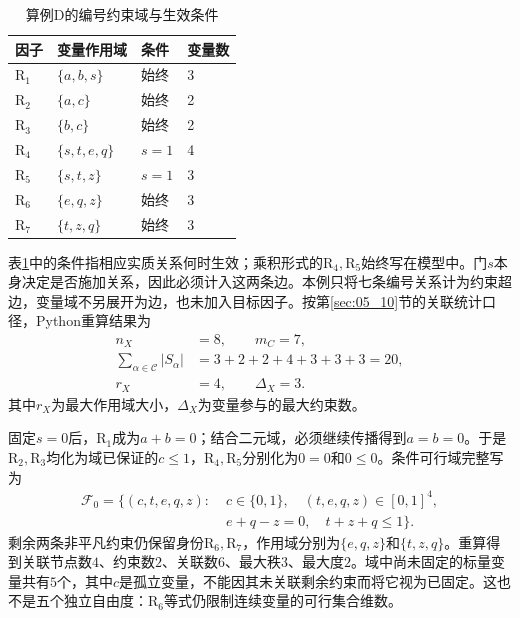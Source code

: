 \begin{table}[htbp]
\centering
\caption{算例D的编号约束域与生效条件}
\label{s0511:scopes}
\begin{tabular}{llll}
\toprule
因子 & 变量作用域 & 条件 & 变量数\\
\midrule
$\mathrm R_1$ & $\{a,b,s\}$ & 始终 & 3\\
$\mathrm R_2$ & $\{a,c\}$ & 始终 & 2\\
$\mathrm R_3$ & $\{b,c\}$ & 始终 & 2\\
$\mathrm R_4$ & $\{s,t,e,q\}$ & $s=1$ & 4\\
$\mathrm R_5$ & $\{s,t,z\}$ & $s=1$ & 3\\
$\mathrm R_6$ & $\{e,q,z\}$ & 始终 & 3\\
$\mathrm R_7$ & $\{t,z,q\}$ & 始终 & 3\\
\bottomrule
\end{tabular}
\end{table}

表\ref{s0511:scopes}中的条件指相应实质关系何时生效；乘积形式的$\mathrm R_4,\mathrm R_5$始终写在模型中。门$s$本身决定是否施加关系，因此必须计入这两条边。本例只将七条编号关系计为约束超边，变量域不另展开为边，也未加入目标因子。按第\ref{sec:05_10}节的关联统计口径，Python重算结果为
\begin{equation}
\label{s0511:original_counts}
\begin{aligned}
 n_X&=8,\qquad m_C=7,\\
 \sum_{\alpha\in\mathcal C}|S_\alpha|
 &=3+2+2+4+3+3+3=20,\\
 r_X&=4,\qquad\Delta_X=3.
\end{aligned}
\end{equation}
其中$r_X$为最大作用域大小，$\Delta_X$为变量参与的最大约束数。

固定$s=0$后，$\mathrm R_1$成为$a+b=0$；结合二元域，必须继续传播得到$a=b=0$。于是$\mathrm R_2,\mathrm R_3$均化为域已保证的$c\leq1$，$\mathrm R_4,\mathrm R_5$分别化为$0=0$和$0\leq0$。条件可行域完整写为
\begin{equation}
\label{s0511:conditioned_domain}
\begin{aligned}
 \mathcal F_0=\bigl\{(c,t,e,q,z):\;&c\in\{0,1\},\quad
 (t,e,q,z)\in[0,1]^4,\\
 &e+q-z=0,\quad t+z+q\leq1\bigr\}.
\end{aligned}
\end{equation}
剩余两条非平凡约束仍保留身份$\mathrm R_6,\mathrm R_7$，作用域分别为$\{e,q,z\}$和$\{t,z,q\}$。重算得到关联节点数$4$、约束数$2$、关联数$6$、最大秩$3$、最大度$2$。域中尚未固定的标量变量共有$5$个，其中$c$是孤立变量，不能因其未关联剩余约束而将它视为已固定。这也不是五个独立自由度：$\mathrm R_6$等式仍限制连续变量的可行集合维数。

